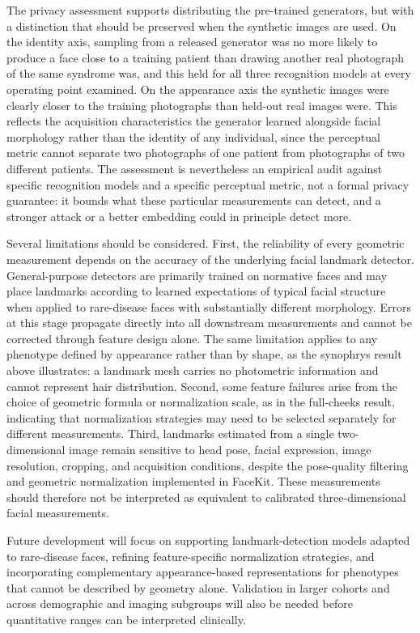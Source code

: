 \documentclass[11pt]{article}
\begin{document}
The privacy assessment supports distributing the pre-trained generators, but with a distinction that should be preserved when the synthetic images are used. On the identity axis, sampling from a released generator was no more likely to produce a face close to a training patient than drawing another real photograph of the same syndrome was, and this held for all three recognition models at every operating point examined. On the appearance axis the synthetic images were clearly closer to the training photographs than held-out real images were. This reflects the acquisition characteristics the generator learned alongside facial morphology rather than the identity of any individual, since the perceptual metric cannot separate two photographs of one patient from photographs of two different patients. The assessment is nevertheless an empirical audit against specific recognition models and a specific perceptual metric, not a formal privacy guarantee: it bounds what these particular measurements can detect, and a stronger attack or a better embedding could in principle detect more.

Several limitations should be considered. First, the reliability of every geometric measurement depends on the accuracy of the underlying facial landmark detector. General-purpose detectors are primarily trained on normative faces and may place landmarks according to learned expectations of typical facial structure when applied to rare-disease faces with substantially different morphology. Errors at this stage propagate directly into all downstream measurements and cannot be corrected through feature design alone. The same limitation applies to any phenotype defined by appearance rather than by shape, as the synophrys result above illustrates: a landmark mesh carries no photometric information and cannot represent hair distribution. Second, some feature failures arise from the choice of geometric formula or normalization scale, as in the full-cheeks result, indicating that normalization strategies may need to be selected separately for different measurements. Third, landmarks estimated from a single two-dimensional image remain sensitive to head pose, facial expression, image resolution, cropping, and acquisition conditions, despite the pose-quality filtering and geometric normalization implemented in FaceKit. These measurements should therefore not be interpreted as equivalent to calibrated three-dimensional facial measurements.

Future development will focus on supporting landmark-detection models adapted to rare-disease faces, refining feature-specific normalization strategies, and incorporating complementary appearance-based representations for phenotypes that cannot be described by geometry alone. Validation in larger cohorts and across demographic and imaging subgroups will also be needed before quantitative ranges can be interpreted clinically.



\end{document}
